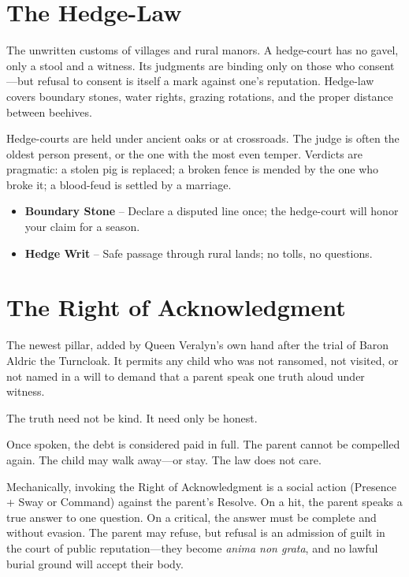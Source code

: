 \documentclass[11pt,twoside]{book}
\newenvironment{sidebar}[1][]
{\begin{tcolorbox}[colback=agedpaper,colframe=royalblue,boxrule=0.5pt,arc=2mm,title={\scshape\small #1},fonttitle=\bfseries,breakable]}
{\end{tcolorbox}}
\begin{document}
\section{The Hedge-Law}

The unwritten customs of villages and rural manors. A hedge-court has no gavel, only a stool and a witness. Its judgments are binding only on those who consent---but refusal to consent is itself a mark against one's reputation. Hedge-law covers boundary stones, water rights, grazing rotations, and the proper distance between beehives.

Hedge-courts are held under ancient oaks or at crossroads. The judge is often the oldest person present, or the one with the most even temper. Verdicts are pragmatic: a stolen pig is replaced; a broken fence is mended by the one who broke it; a blood-feud is settled by a marriage.

\begin{sidebar}[Strings (Hedge-Law)]
\begin{itemize}
    \item \textbf{Boundary Stone} -- Declare a disputed line once; the hedge-court will honor your claim for a season.
    \item \textbf{Hedge Writ} -- Safe passage through rural lands; no tolls, no questions.
\end{itemize}
\end{sidebar}

\section{The Right of Acknowledgment}

The newest pillar, added by Queen Veralyn's own hand after the trial of Baron Aldric the Turncloak. It permits any child who was not ransomed, not visited, or not named in a will to demand that a parent speak one truth aloud under witness.

The truth need not be kind. It need only be honest.

Once spoken, the debt is considered paid in full. The parent cannot be compelled again. The child may walk away---or stay. The law does not care.

Mechanically, invoking the Right of Acknowledgment is a social action (Presence + Sway or Command) against the parent's Resolve. On a hit, the parent speaks a true answer to one question. On a critical, the answer must be complete and without evasion. The parent may refuse, but refusal is an admission of guilt in the court of public reputation---they become \textit{anima non grata}, and no lawful burial ground will accept their body.
\end{document}
